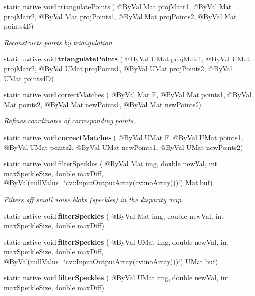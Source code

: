 \begin{DoxyCompactItemize}
\item 
static native void \hyperlink{group__calib3d_ga12a47c5bb55266df7219c8f3e385f156}{triangulate\+Points} ( @By\+Val Mat proj\+Matr1, @By\+Val Mat proj\+Matr2, @By\+Val Mat proj\+Points1, @By\+Val Mat proj\+Points2, @By\+Val Mat points4D)
\begin{DoxyCompactList}\small\item\em Reconstructs points by triangulation. \end{DoxyCompactList}\item 
static native void {\bfseries triangulate\+Points} ( @By\+Val U\+Mat proj\+Matr1, @By\+Val U\+Mat proj\+Matr2, @By\+Val U\+Mat proj\+Points1, @By\+Val U\+Mat proj\+Points2, @By\+Val U\+Mat points4D)
\item 
static native void \hyperlink{group__calib3d_gad0d4f7daee2c8fda384311c1bce0965a}{correct\+Matches} ( @By\+Val Mat F, @By\+Val Mat points1, @By\+Val Mat points2, @By\+Val Mat new\+Points1, @By\+Val Mat new\+Points2)
\begin{DoxyCompactList}\small\item\em Refines coordinates of corresponding points. \end{DoxyCompactList}\item 
static native void {\bfseries correct\+Matches} ( @By\+Val U\+Mat F, @By\+Val U\+Mat points1, @By\+Val U\+Mat points2, @By\+Val U\+Mat new\+Points1, @By\+Val U\+Mat new\+Points2)
\item 
static native void \hyperlink{group__calib3d_ga18894b69acb224417c0f0a1afaded536}{filter\+Speckles} ( @By\+Val Mat img, double new\+Val, int max\+Speckle\+Size, double max\+Diff, @By\+Val(null\+Value=\char`\"{}cv\+::\+Input\+Output\+Array(cv\+::no\+Array())\char`\"{}) Mat buf)
\begin{DoxyCompactList}\small\item\em Filters off small noise blobs (speckles) in the disparity map. \end{DoxyCompactList}\item 
static native void {\bfseries filter\+Speckles} ( @By\+Val Mat img, double new\+Val, int max\+Speckle\+Size, double max\+Diff)
\item 
static native void {\bfseries filter\+Speckles} ( @By\+Val U\+Mat img, double new\+Val, int max\+Speckle\+Size, double max\+Diff, @By\+Val(null\+Value=\char`\"{}cv\+::\+Input\+Output\+Array(cv\+::no\+Array())\char`\"{}) U\+Mat buf)
\item 
static native void {\bfseries filter\+Speckles} ( @By\+Val U\+Mat img, double new\+Val, int max\+Speckle\+Size, double max\+Diff)

\end{DoxyCompactItemize}
